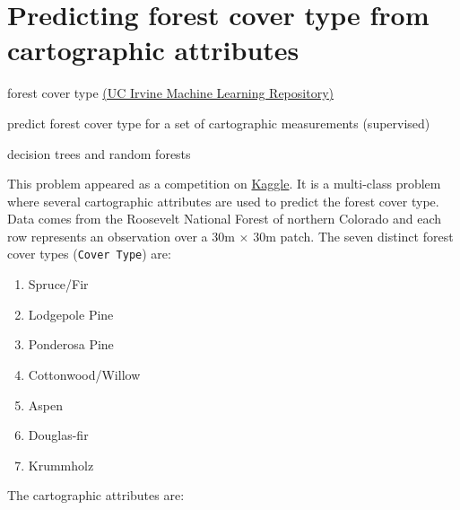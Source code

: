 \documentclass[a4paper,11pt]{article}
\begin{document}
\section{Predicting forest cover type from cartographic attributes}
\begin{framed}
\begin{description}[leftmargin=5em,style=nextline]\addtolength{\itemsep}{-0.2\baselineskip}
	\item[Data:] forest cover type \href{https://archive.ics.uci.edu/ml/datasets/Covertype}{(UC Irvine Machine Learning Repository)}	
	\item[Task:] predict forest cover type for a set of cartographic measurements (supervised)
	\item[Method:] decision trees and random forests
\end{description} 
\end{framed}

This problem appeared as a competition on \href{http://www.kaggle.com/c/forest-cover-type-prediction}{Kaggle}.
It is a multi-class problem where several cartographic attributes are used to predict the forest cover type.
Data comes from the Roosevelt National Forest of northern Colorado and each row represents an observation 
over a 30m $\times$ 30m  patch. The seven distinct forest cover types (\texttt{Cover Type}) are:

\begin{enumerate}\addtolength{\itemsep}{-0.3\baselineskip}
	\item Spruce/Fir
	\item Lodgepole Pine
	\item Ponderosa Pine
	\item Cottonwood/Willow
	\item Aspen
	\item Douglas-fir
	\item Krummholz
\end{enumerate}

The cartographic attributes are:
\end{document}
